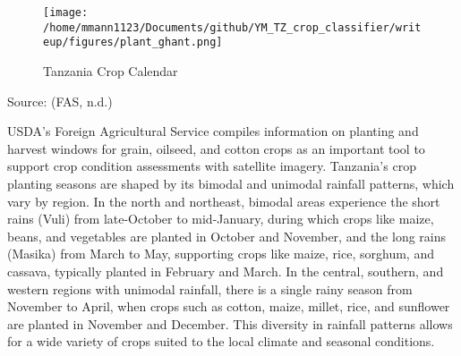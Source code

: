 \documentclass[
  journal,
  twocolumn]{IEEEtran}
\begin{document}
\begin{figure}[H]
   \centering   \texttt{[image: /home/mmann1123/Documents/github/YM\_TZ\_crop\_classifier/writeup/figures/plant\_ghant.png]}
   \caption{Tanzania Crop Calendar }
   \label{fig:crop_cal} %
\end{figure}

Source: (FAS, n.d.)

USDA's Foreign Agricultural Service compiles information on planting and
harvest windows for grain, oilseed, and cotton crops as an important
tool to support crop condition assessments with satellite imagery.
Tanzania's crop planting seasons are shaped by its bimodal and unimodal
rainfall patterns, which vary by region. In the north and northeast,
bimodal areas experience the short rains (Vuli) from late-October to
mid-January, during which crops like maize, beans, and vegetables are
planted in October and November, and the long rains (Masika) from March
to May, supporting crops like maize, rice, sorghum, and cassava,
typically planted in February and March. In the central, southern, and
western regions with unimodal rainfall, there is a single rainy season
from November to April, when crops such as cotton, maize, millet, rice,
and sunflower are planted in November and December. This diversity in
rainfall patterns allows for a wide variety of crops suited to the local
climate and seasonal conditions.
\end{document}
